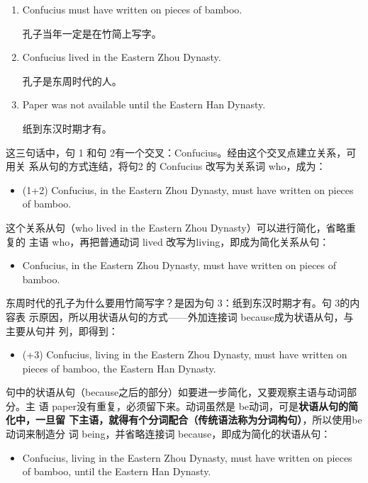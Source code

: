 \begin{enumerate}
\item Confucius must have written on pieces of bamboo.

  孔子当年一定是在竹简上写字。
\item Confucius lived in the Eastern Zhou Dynasty.

  孔子是东周时代的人。
\item Paper was not available until the Eastern Han Dynasty.

  纸到东汉时期才有。
\end{enumerate}

这三句话中，句 1 和句 2有一个交叉：Confucius。经由这个交叉点建立关系，可用关
系从句的方式连结，将句2 的 Confucius 改写为关系词 who，成为：
\begin{itemize}
\item (1+2) Confucius,  in the Eastern Zhou Dynasty, must have
  written on pieces of bamboo.
\end{itemize}
这个关系从句（who lived in the Eastern Zhou Dynasty）可以进行简化，省略重复的
主语 who，再把普通动词 lived 改写为living，即成为简化关系从句：
\begin{itemize}
\item Confucius,  in the Eastern Zhou Dynasty, must have written on
  pieces of bamboo.
\end{itemize}
东周时代的孔子为什么要用竹简写字？是因为句 3：纸到东汉时期才有。句 3的内容表
示原因，所以用状语从句的方式——外加连接词 because成为状语从句，与主要从句并
列，即得到：
\begin{itemize}
\item (+3) Confucius, living in the Eastern Zhou Dynasty, must have written on
  pieces of bamboo,  the Eastern Han Dynasty.
\end{itemize}

句中的状语从句（because之后的部分）如要进一步简化，又要观察主语与动词部分。主
语 paper没有重复，必须留下来。动词虽然是 be动词，可是\textbf{状语从句的简化中，一旦留
下主语，就得有个分词配合（传统语法称为分词构句）}，所以使用be 动词来制造分
词 being，并省略连接词 because，即成为简化的状语从句：

\begin{itemize}
\item Confucius, living in the Eastern Zhou Dynasty, must have written on
  pieces of bamboo,  until the Eastern Han Dynasty.
\end{itemize}

